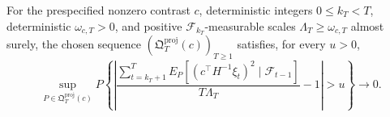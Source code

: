 For the prespecified nonzero contrast \(c\), deterministic integers \(0\le k_T<T\), deterministic \(\omega_{c,T}>0\), and positive \(\mathcal F_{k_T}\)-measurable scales \(\Lambda_T\ge\omega_{c,T}\) almost surely, the chosen sequence \((\mathfrak Q_T^{\mathrm{proj}}(c))_{T\ge1}\) satisfies, for every \(u>0\),
\[
 \sup_{P\in\mathfrak Q_T^{\mathrm{proj}}(c)}
 P\!\left\{
 \left|
 \frac{\sum_{t=k_T+1}^T E_P[(c^\top H^{-1}\xi_t)^2\mid\mathcal F_{t-1}]}
 {T\Lambda_T}-1
 \right|>u
 \right\}\longrightarrow0.
\]